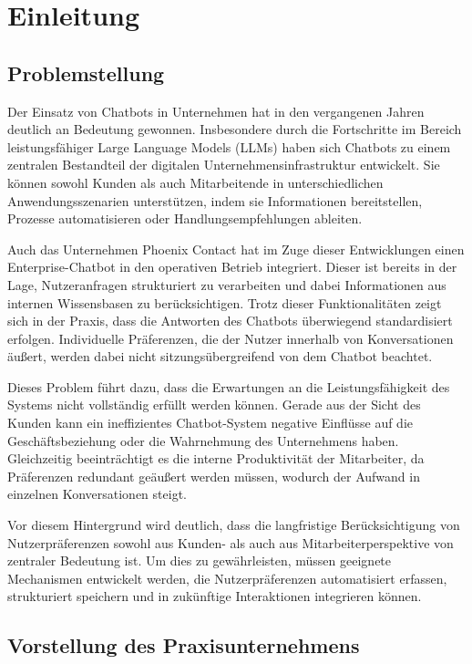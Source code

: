 
\section{Einleitung}

\subsection{Problemstellung}

Der Einsatz von Chatbots in Unternehmen hat in den vergangenen Jahren deutlich an Bedeutung gewonnen. Insbesondere durch die Fortschritte im Bereich leistungsfähiger Large Language Models (LLMs) haben sich Chatbots zu einem zentralen Bestandteil der digitalen Unternehmensinfrastruktur entwickelt. Sie können sowohl Kunden als auch Mitarbeitende in unterschiedlichen Anwendungsszenarien unterstützen, indem sie Informationen bereitstellen, Prozesse automatisieren oder Handlungsempfehlungen ableiten.

Auch das Unternehmen Phoenix Contact hat im Zuge dieser Entwicklungen einen Enterprise-Chatbot in den operativen Betrieb integriert. Dieser ist bereits in der Lage, Nutzeranfragen strukturiert zu verarbeiten und dabei Informationen aus internen Wissensbasen zu berücksichtigen. Trotz dieser Funktionalitäten zeigt sich in der Praxis, dass die Antworten des Chatbots überwiegend standardisiert erfolgen. Individuelle Präferenzen, die der Nutzer innerhalb von Konversationen äußert, werden dabei nicht sitzungsübergreifend von dem Chatbot beachtet.

Dieses Problem führt dazu, dass die Erwartungen an die Leistungsfähigkeit des Systems nicht vollständig erfüllt werden können. Gerade aus der Sicht des Kunden kann ein ineffizientes Chatbot-System negative Einflüsse auf die Geschäftsbeziehung oder die Wahrnehmung des Unternehmens haben. Gleichzeitig beeinträchtigt es die interne Produktivität der Mitarbeiter, da Präferenzen redundant geäußert werden müssen, wodurch der Aufwand in einzelnen Konversationen steigt.

Vor diesem Hintergrund wird deutlich, dass die langfristige Berücksichtigung von Nutzerpräferenzen sowohl aus Kunden- als auch aus Mitarbeiterperspektive von zentraler Bedeutung ist. Um dies zu gewährleisten, müssen geeignete Mechanismen entwickelt werden, die Nutzerpräferenzen automatisiert erfassen, strukturiert speichern und in zukünftige Interaktionen integrieren können.

\subsection{Vorstellung des Praxisunternehmens}

